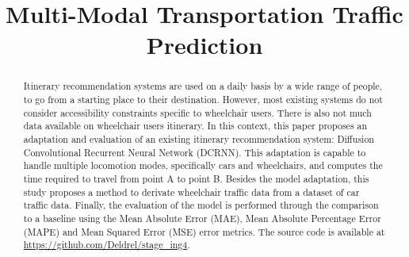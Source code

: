 \documentclass[conference]{IEEEtran}
\begin{document}



    \title{Multi-Modal Transportation Traffic Prediction}

    \maketitle

    \begin{abstract}
        Itinerary recommendation systems are used on a daily basis by a wide range of people, to go from a starting place to their destination.
        However, most existing systems do not consider accessibility constraints specific to wheelchair users.
        There is also not much data available on wheelchair users itinerary.
        In this context, this paper proposes an adaptation and evaluation of an existing itinerary recommendation system: Diffusion Convolutional Recurrent Neural Network (DCRNN).
        This adaptation is capable to handle multiple locomotion modes, specifically cars and wheelchairs, and computes the time required to travel from point A to point B.
        Besides the model adaptation, this study proposes a method to derivate wheelchair traffic data from a dataset of car traffic data.
        Finally, the evaluation of the model is performed through the comparison to a baseline using the Mean Absolute Error (MAE), Mean Absolute Percentage Error (MAPE) and Mean Squared Error (MSE) error metrics.
        The source code is available at \url{https://github.com/Deldrel/stage_ing4}.
    \end{abstract}
\end{document}
